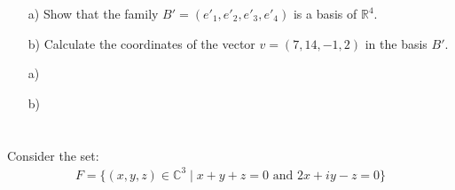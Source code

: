 \documentclass[12pt]{article}
\begin{document}
\begin{enumerate}
    \item[a)] Show that the family $B' = (e'_1, e'_2, e'_3, e'_4)$ is a basis of $\mathbb{R}^4$.
    \item[b)] Calculate the coordinates of the vector $v = (7, 14, -1, 2)$ in the basis $B'$.
\end{enumerate}
                                                                                                                                                                                                                                         
\begin{correctionbox}                                                                                                                                                                                                                    
 \begin{enumerate}                                                                                
     \item[a)] 
     \item[b)] 
 \end{enumerate}                                                                                  
\end{correctionbox}                                                                                                                                                                                                                      
                                                                                                                                                                                                                                         
\section{}                                                                                                                                                                                                                               
Consider the set:
\begin{align*}
F = \{(x, y, z) \in \mathbb{C}^3 \mid x + y + z = 0 \text{ and } 2x + iy - z = 0\}
\end{align*}
\end{document}
